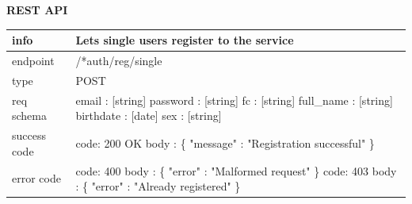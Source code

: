 \documentclass[titlepage]{article}
\begin{document}
\pagebreak

{\bf REST API}

\begin{tabularx}{\textwidth}{lX} \hline
    info & Lets single users register to the service \\ \hline
    endpoint & /*auth/reg/single \\ \hline
    type & POST \\ \hline
    req schema & 
        email : [string] \newline
        password : [string] \newline
        fc : [string] \newline
        full\_name : [string] \newline
        birthdate : [date] \newline
        sex : [string] \\ \hline
    success code &
        code: 200 OK \newline 
        body : \{ \newline
        "message" : "Registration successful" \newline
        \} \\ \hline
    error code &
        code: 400 \newline
        body : \{ "error" : "Malformed request" \} \newline \newline
        code: 403 \newline
        body : \{ "error" : "Already registered" \}  \\ \hline
\end{tabularx}

\vspace{\baselineskip}
\end{document}
